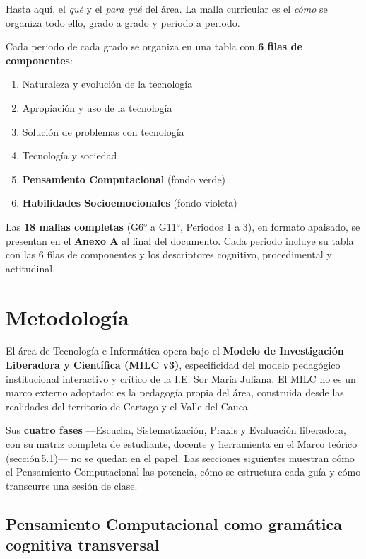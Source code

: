 \documentclass[12pt, a4paper]{article}
\begin{document}
\noindent Hasta aquí, el \emph{qué} y el \emph{para qué} del área. La malla
curricular es el \emph{cómo} se organiza todo ello, grado a grado y periodo a
periodo.

\medskip
\noindent Cada periodo de cada grado se organiza en una tabla con \textbf{6 filas
de componentes}:

\begin{enumerate}
  \item Naturaleza y evolución de la tecnología
  \item Apropiación y uso de la tecnología
  \item Solución de problemas con tecnología
  \item Tecnología y sociedad
  \item \textcolor{verdePC}{\textbf{Pensamiento Computacional}} (fondo verde)
  \item \textcolor{moradoSEL}{\textbf{Habilidades Socioemocionales}} (fondo violeta)
\end{enumerate}

Las \textbf{18 mallas completas} (G6° a G11°, Periodos 1 a 3), en formato
apaisado, se presentan en el \textbf{Anexo A} al final del documento. Cada
periodo incluye su tabla con las 6 filas de componentes y los descriptores
cognitivo, procedimental y actitudinal.


\section{Metodología}

El área de Tecnología e Informática opera bajo el \textbf{Modelo de Investigación
Liberadora y Científica (MILC v3)}, especificidad del modelo pedagógico institucional
interactivo y crítico de la I.E. Sor María Juliana. El MILC no es un marco externo
adoptado: es la pedagogía propia del área, construida desde las realidades del
territorio de Cartago y el Valle del Cauca.

Sus \textbf{cuatro fases} —Escucha, Sistematización, Praxis y Evaluación
liberadora, con su matriz completa de estudiante, docente y herramienta en el
Marco teórico (sección\,5.1)— no se quedan en el papel. Las secciones siguientes muestran
cómo el Pensamiento Computacional las potencia, cómo se estructura cada guía y
cómo transcurre una sesión de clase.

\subsection{Pensamiento Computacional como gramática cognitiva transversal}
\end{document}
